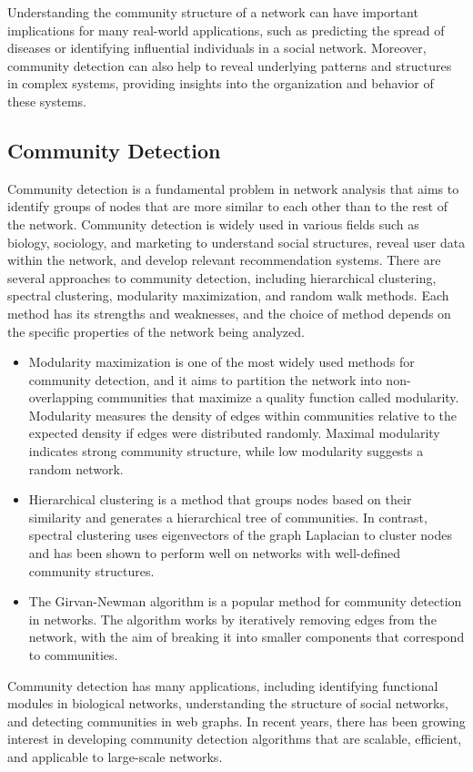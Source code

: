Understanding the community structure of a network can have important implications for many real-world applications, such as predicting the spread of diseases or identifying influential individuals in a social network. Moreover, community detection can also help to reveal underlying patterns and structures in complex systems, providing insights into the organization and behavior of these systems.
\subsection{Community Detection}
Community detection is a fundamental problem in network analysis that aims to identify groups of nodes that are more similar to each other than to the rest of the network. Community detection is widely used in various fields such as biology, sociology, and marketing to understand social structures, reveal user data within the network, and develop relevant recommendation systems.
There are several approaches to community detection, including hierarchical clustering, spectral clustering, modularity maximization, and random walk methods. Each method has its strengths and weaknesses, and the choice of method depends on the specific properties of the network being analyzed.
\begin{itemize}
    \item Modularity maximization is one of the most widely used methods for community detection, and it aims to partition the network into non-overlapping communities that maximize a quality function called modularity. Modularity measures the density of edges within communities relative to the expected density if edges were distributed randomly. Maximal modularity indicates strong community structure, while low modularity suggests a random network.
    \item Hierarchical clustering is a method that groups nodes based on their similarity and generates a hierarchical tree of communities. In contrast, spectral clustering uses eigenvectors of the graph Laplacian to cluster nodes and has been shown to perform well on networks with well-defined community structures.
    \item The Girvan-Newman algorithm is a popular method for community detection in networks. The algorithm works by iteratively removing edges from the network, with the aim of breaking it into smaller components that correspond to communities.
\end{itemize}
Community detection has many applications, including identifying functional modules in biological networks, understanding the structure of social networks, and detecting communities in web graphs. In recent years, there has been growing interest in developing community detection algorithms that are scalable, efficient, and applicable to large-scale networks.
